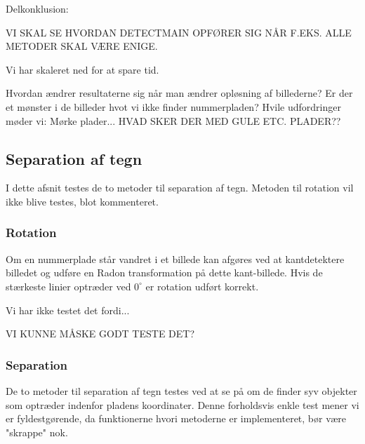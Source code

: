 \begin{comment} %
\subsubsection*{Observeret sæt på 407 billeder}
Scale: 0.25
DetectMain: 96.6/99.24
DetectQuant: 67.8/75.4
DetectSameness: 56.8/95.5
DetectContrastAvg: 62.7/85.0
DetectPlateness: 50.4/65.5
DetectCStretch: 84.0/92.7

Scale: 0.50 (Ekstremt langsomt)
DetectPlateness: 29.7/56.5
DetectCStretch:
\end{comment}


Delkonklusion:

VI SKAL SE HVORDAN DETECTMAIN OPFØRER SIG NÅR F.EKS. ALLE METODER SKAL VÆRE ENIGE.

Vi har skaleret ned for at spare tid.

Hvordan ændrer resultaterne sig når man ændrer opløsning af billederne?
Er der et mønster i de billeder hvot vi ikke finder nummerpladen? Hvile udfordringer møder vi: Mørke plader... 
HVAD SKER DER MED GULE ETC. PLADER??



\subsection{Separation af tegn}
I dette afsnit testes de to metoder til separation af tegn. Metoden til rotation vil ikke blive testes, blot kommenteret.

\subsubsection*{Rotation}
Om en nummerplade står vandret i et billede kan afgøres ved at kantdetektere billedet og udføre en Radon transformation på dette kant-billede. Hvis de stærkeste linier optræder ved $0^{\circ}$ er rotation udført korrekt.

Vi har ikke testet det fordi...

VI KUNNE MÅSKE GODT TESTE DET?

\subsubsection*{Separation}
De to metoder til separation af tegn testes ved at se på om de finder syv objekter som optræder indenfor pladens koordinater. Denne forholdsvis enkle test mener vi er fyldestgørende, da funktionerne hvori metoderne er implementeret, bør være "skrappe" nok.

